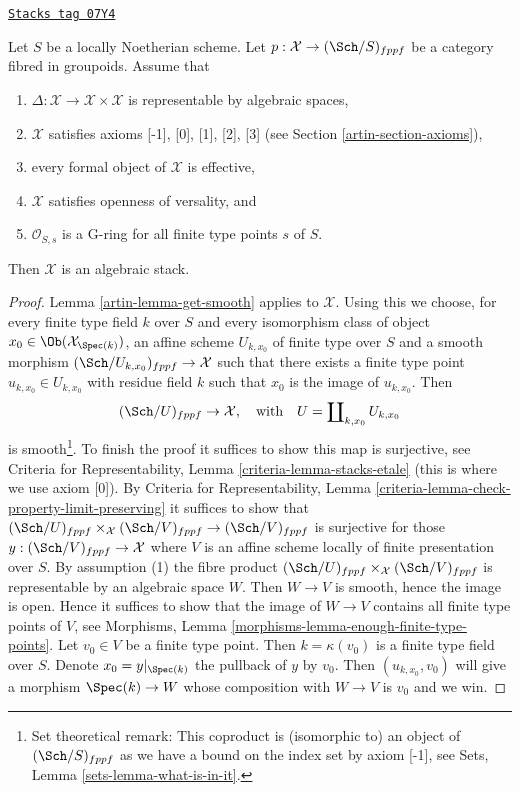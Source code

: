 \begin{lemma}
\label{artin-lemma-diagonal-representable}
\href{https://stacks.math.columbia.edu/tag/07Y4}{\texttt{Stacks tag 07Y4}}

Let $S$ be a locally Noetherian scheme. Let
$p : \mathcal{X} \to (\Sch/S)_{fppf}$ be a category fibred in groupoids.
Assume that
\begin{enumerate}
\item $\Delta : \mathcal{X} \to \mathcal{X} \times \mathcal{X}$
is representable by algebraic spaces,
\item $\mathcal{X}$ satisfies axioms [-1], [0], [1], [2], [3] (see
Section \ref{artin-section-axioms}),
\item every formal object of $\mathcal{X}$ is effective,
\item $\mathcal{X}$ satisfies openness of versality, and
\item $\mathcal{O}_{S, s}$ is a G-ring for all finite type points $s$ of $S$.
\end{enumerate}
Then $\mathcal{X}$ is an algebraic stack.
\end{lemma}

\begin{proof}

Lemma \ref{artin-lemma-get-smooth} applies to $\mathcal{X}$. Using this we
choose, for every finite type field $k$ over $S$ and every
isomorphism class of object $x_0 \in \Ob(\mathcal{X}_{\Spec(k)})$,
an affine scheme $U_{k, x_0}$ of finite type over $S$ and a smooth morphism
$(\Sch/U_{k, x_0})_{fppf} \to \mathcal{X}$ such that there exists a finite
type point $u_{k, x_0} \in U_{k, x_0}$ with residue field $k$ such that $x_0$
is the image of $u_{k, x_0}$. Then
$$
(\Sch/U)_{fppf} \to \mathcal{X},
\quad\text{with}\quad
U = \coprod\nolimits_{k, x_0} U_{k, x_0}
$$
is smooth\footnote{Set theoretical remark: This coproduct is (isomorphic to)
an object of $(\Sch/S)_{fppf}$ as we have a bound on the index set
by axiom [-1], see Sets, Lemma \ref{sets-lemma-what-is-in-it}.}.
To finish the proof it suffices to show this map is surjective,
see Criteria for Representability, Lemma \ref{criteria-lemma-stacks-etale}
(this is where we use axiom [0]). By Criteria for Representability, Lemma
\ref{criteria-lemma-check-property-limit-preserving}
it suffices to show that
$(\Sch/U)_{fppf} \times_\mathcal{X} (\Sch/V)_{fppf} \to (\Sch/V)_{fppf}$
is surjective for those $y : (\Sch/V)_{fppf} \to \mathcal{X}$ where
$V$ is an affine scheme locally of finite presentation
over $S$. By assumption (1) the fibre product
$(\Sch/U)_{fppf} \times_\mathcal{X} (\Sch/V)_{fppf}$ is representable
by an algebraic space $W$. Then $W \to V$ is smooth, hence the image is
open. Hence it suffices to show that the image of $W \to V$ contains all
finite type points of $V$, see
Morphisms, Lemma \ref{morphisms-lemma-enough-finite-type-points}.
Let $v_0 \in V$ be a finite type point. Then $k = \kappa(v_0)$ is
a finite type field over $S$. Denote $x_0 = y|_{\Spec(k)}$
the pullback of $y$ by $v_0$. Then $(u_{k, x_0}, v_0)$ will give
a morphism $\Spec(k) \to W$ whose composition with $W \to V$
is $v_0$ and we win.
\end{proof}

